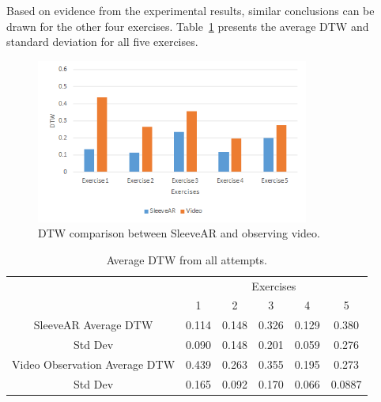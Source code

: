 Based on evidence from the experimental results, similar conclusions can be drawn for the other four exercises. Table~\ref{table:dtwavg} presents the average DTW and standard deviation for all five exercises.


\begin{figure}[!t]
    \begin{center}
        \includegraphics[width=0.8\textwidth]{imgs/results/dtw}
    \end{center}
    \caption{DTW comparison between SleeveAR and observing video.}
    \label{fig:dtw}
\end{figure}

\begin{table}[!t]
\centering
\begin{tabular}{c|c|c|c|c|c|}
\cline{2-6}
\multicolumn{1}{l|}{}                               & \multicolumn{5}{c|}{Exercises}             \\ \cline{2-6} 
                                                    & 1      & 2      & 3      & 4      & 5      \\ \hline
\multicolumn{1}{|c|}{SleeveAR Average DTW}          & 0.114 & 0.148 & 0.326 & 0.129 & 0.380 \\ \hline
\multicolumn{1}{|c|}{Std Dev}                       & 0.090 & 0.148  & 0.201 & 0.059 & 0.276 \\ \hline
\multicolumn{1}{|c|}{Video Observation Average DTW} & 0.439  & 0.263  & 0.355 & 0.195 & 0.273 \\ \hline
\multicolumn{1}{|c|}{Std Dev}                       & 0.165 & 0.092 & 0.170 & 0.066 & 0.0887 \\ \hline
\end{tabular}
\caption{Average DTW from all attempts.}
\label{table:dtwavg}
\end{table}

